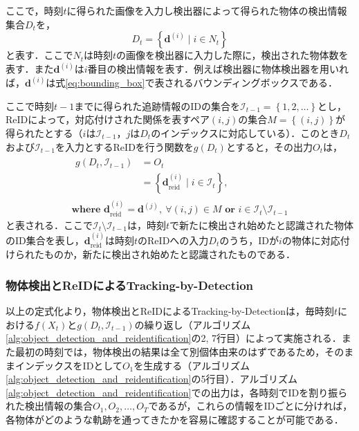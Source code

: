         ここで，時刻$t$に得られた画像を入力し検出器によって得られた物体の検出情報集合$D_t$を，
        \begin{equation}
            \label{eq:input_to_reid}
            D_t = \left\{\bm{d}^{(i)} \mid i \in N_t\right\}
        \end{equation}
        と表す．ここで$N_t$は時刻$t$の画像を検出器に入力した際に，検出された物体数を表す．また$\bm{d}^{(i)}$は$i$番目の検出情報を表す．例えば検出器に物体検出器を用いれば，$\bm{d}^{(i)}$は式\ref{eq:bounding_box}で表されるバウンディングボックスである．

        ここで時刻$t-1$までに得られた追跡情報のIDの集合を$\mathcal{I}_{t-1} = \left\{1, 2, \dots\right\}$とし，ReIDによって，対応付けされた関係を表すペア$(i, j)$の集合$M = \left\{(i, j)\right\}$が得られたとする（$i$は$\mathcal{I}_{t-1}$，$j$は$D_t$のインデックスに対応している）．このとき$D_t$および$\mathcal{I}_{t-1}$を入力とするReIDを行う関数を$g(D_t)$とすると，その出力$O_t$は，
        \begin{equation}
            \label{eq:output_of_reid}
            \begin{gathered}
                \begin{aligned}
                    g(D_t, \mathcal{I}_{t-1}) &= O_t
                    \\ &= \left\{\bm{d}_{\text{reid}}^{(i)} \mid i \in \mathcal{I}_t\right\},
                \end{aligned}
                \\ \textbf{where } \bm{d}_{\text{reid}}^{(i)} = \bm{d}^{(j)}, ~ \forall (i, j) \in M \textbf{ or } i \in \mathcal{I}_t \setminus \mathcal{I}_{t-1}
            \end{gathered}
        \end{equation}
        と表される．ここで$\mathcal{I}_t \setminus \mathcal{I}_{t-1}$は，時刻$t$で新たに検出され始めたと認識された物体のID集合を表し，$\bm{d}_{\text{reid}}^{(i)}$は時刻$t$のReIDへの入力$D_t$のうち，IDが$i$の物体に対応付けられたものか，新たに検出され始めたと認識されたものである．

        \subsubsection{物体検出とReIDによるTracking-by-Detection}
        以上の定式化より，物体検出とReIDによるTracking-by-Detectionは，毎時刻$t$における$f(X_t)$と$g(D_t, \mathcal{I}_{t-1})$の繰り返し（アルゴリズム\ref{alg:object_detection_and_reidentification}の2, 7行目）によって実施される．また最初の時刻では，物体検出の結果は全て別個体由来のはずであるため，そのままインデックスをIDとして$O_1$を生成する（アルゴリズム\ref{alg:object_detection_and_reidentification}の5行目）．アルゴリズム\ref{alg:object_detection_and_reidentification}での出力は，各時刻でIDを割り振られた検出情報の集合$O_1, O_2, \dots, O_T$であるが，これらの情報をIDごとに分ければ，各物体がどのような軌跡を通ってきたかを容易に確認することが可能である．

